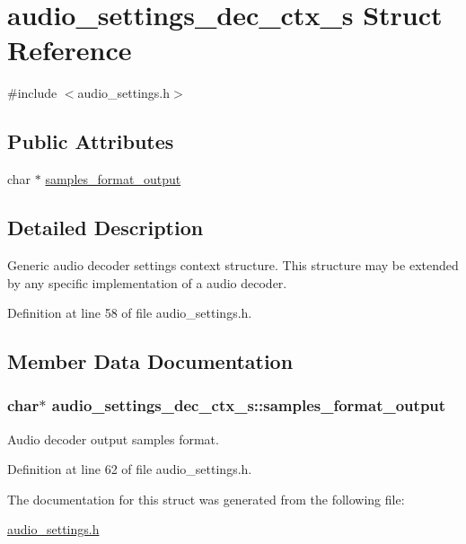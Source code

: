 \hypertarget{structaudio__settings__dec__ctx__s}{}\section{audio\+\_\+settings\+\_\+dec\+\_\+ctx\+\_\+s Struct Reference}
\label{structaudio__settings__dec__ctx__s}


{\ttfamily \#include $<$audio\+\_\+settings.\+h$>$}

\subsection*{Public Attributes}
\begin{DoxyCompactItemize}
\item 
char $\ast$ \hyperlink{structaudio__settings__dec__ctx__s_a6373179439259ab79ff323c786b12002}{samples\+\_\+format\+\_\+output}
\end{DoxyCompactItemize}


\subsection{Detailed Description}
Generic audio decoder settings context structure. This structure may be extended by any specific implementation of a audio decoder. 

Definition at line 58 of file audio\+\_\+settings.\+h.



\subsection{Member Data Documentation}
\subsubsection[{\texorpdfstring{samples\+\_\+format\+\_\+output}{samples_format_output}}]{\setlength{\rightskip}{0pt plus 5cm}char$\ast$ audio\+\_\+settings\+\_\+dec\+\_\+ctx\+\_\+s\+::samples\+\_\+format\+\_\+output}\hypertarget{structaudio__settings__dec__ctx__s_a6373179439259ab79ff323c786b12002}{}\label{structaudio__settings__dec__ctx__s_a6373179439259ab79ff323c786b12002}
Audio decoder output samples format. 

Definition at line 62 of file audio\+\_\+settings.\+h.



The documentation for this struct was generated from the following file\+:\begin{DoxyCompactItemize}
\item 
\hyperlink{audio__settings_8h}{audio\+\_\+settings.\+h}\end{DoxyCompactItemize}
